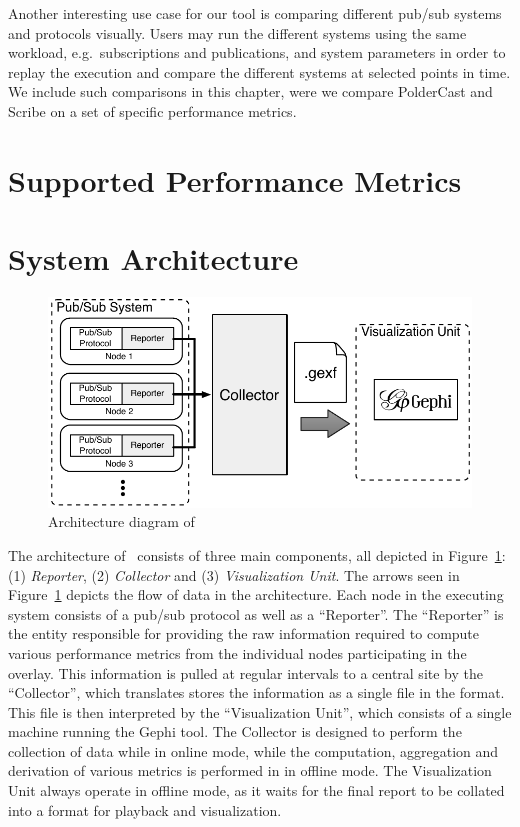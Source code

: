 Another interesting use case for our tool is comparing different pub/sub systems and
protocols visually. Users may run the different systems using the same
workload, e.g.\ subscriptions and publications, and system parameters in
order to replay the execution and compare the different systems at
selected points in time. We include such comparisons in this chapter,
were we compare PolderCast and Scribe on a set of specific performance
metrics.

\section{Supported Performance Metrics}
\label{sec:metrics}



\section{System Architecture}
\label{sec:arch}

\begin{figure}[h]
\centering
\includegraphics[width=\linewidth]{figures/arch}
\caption{Architecture diagram of \demo}
\label{fig:arch}
\end{figure}

The architecture of \demo~consists of three main components, all
depicted in Figure~\ref{fig:arch}: (1) \emph{Reporter}, (2)
\emph{Collector} and (3) \emph{Visualization Unit}.  The arrows seen in
Figure~\ref{fig:arch} depicts the flow of data in the architecture.
Each node in the executing system consists of a pub/sub protocol as well
as a ``Reporter''. The ``Reporter'' is the entity responsible for
providing the raw information required to compute various performance
metrics from the individual nodes participating in the overlay. This
information is pulled at regular intervals to a central site by the
``Collector'', which translates stores the information as a single
file in the \gexf{} format. This file is then interpreted by the
``Visualization Unit'', which consists of a single machine running
the Gephi tool. The Collector is designed to perform the collection of
data while in online mode, while the computation, aggregation and
derivation of various metrics is performed in in offline mode. The
Visualization Unit always operate in offline mode, as it waits for the
final report to be collated into a \gexf{} format for playback and
visualization.

